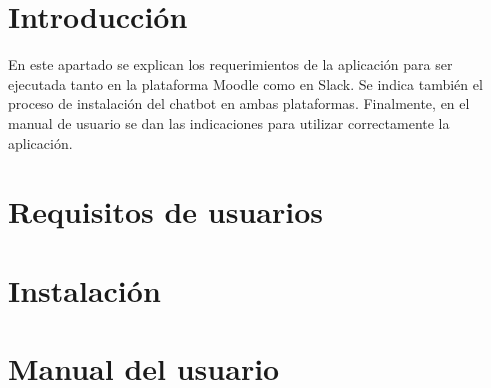 
\section{Introducción}

En este apartado se explican los requerimientos de la aplicación para ser ejecutada tanto en la plataforma Moodle como en Slack. Se indica también el proceso de instalación del chatbot en ambas plataformas. Finalmente, en el manual de usuario se dan las indicaciones para utilizar correctamente la aplicación.

\section{Requisitos de usuarios}



\section{Instalación}

\section{Manual del usuario}


